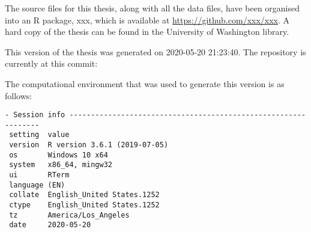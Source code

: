 \documentclass [11pt, proquest] {uwthesis}[2015/03/03]
\begin{document}
The source files for this thesis, along with all the data files, have
been organised into an R package, xxx, which is available at
\url{https://github.com/xxx/xxx}. A hard copy of the thesis can be found
in the University of Washington library.

This version of the thesis was generated on 2020-05-20 21:23:40. The
repository is currently at this commit:

The computational environment that was used to generate this version is
as follows:
\begin{verbatim}
- Session info ---------------------------------------------------------------
 setting  value                       
 version  R version 3.6.1 (2019-07-05)
 os       Windows 10 x64              
 system   x86_64, mingw32             
 ui       RTerm                       
 language (EN)                        
 collate  English_United States.1252  
 ctype    English_United States.1252  
 tz       America/Los_Angeles         
 date     2020-05-20                  


\end{verbatim}
\end{document}
